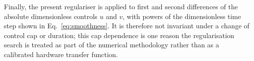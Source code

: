 \documentclass[9pt,a4paper,twocolumn,twoside]{rho-class/rho}
\begin{document}
    Finally, the present regulariser is applied to first and second differences
    of the absolute dimensionless controls $u$ and $v$, with powers of the
    dimensionless time step shown in Eq.~\eqref{eq:smoothness}.  It is therefore
    not invariant under a change of control cap or duration; this cap dependence
    is one reason the regularisation search is treated as part of the numerical
    methodology rather than as a calibrated hardware transfer function.

\printbibliography
\end{document}
